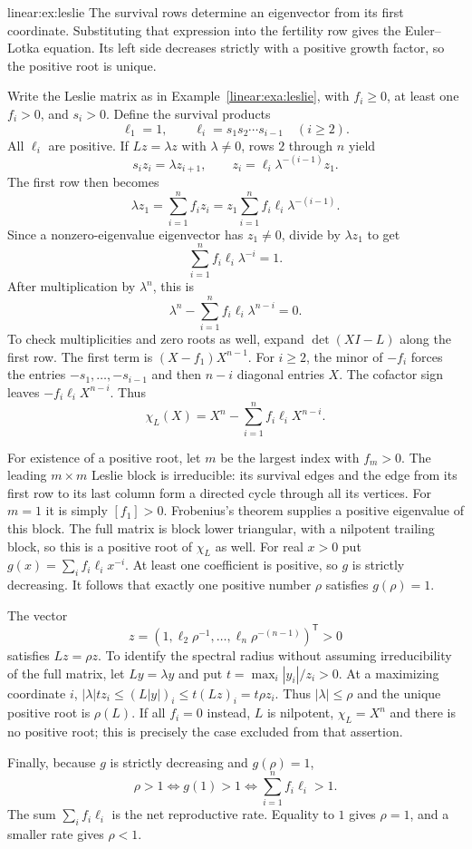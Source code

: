 \begin{solution}{linear:ex:leslie}
\idea The survival rows determine an eigenvector from its first coordinate. Substituting that expression into the fertility row gives the Euler--Lotka equation. Its left side decreases strictly with a positive growth factor, so the positive root is unique.

\writeup Write the Leslie matrix as in Example~\ref{linear:exa:leslie}, with $f_i\ge0$, at least one $f_i>0$, and $s_i>0$. Define the survival products
\[
\ell_1=1,\qquad \ell_i=s_1s_2\cdots s_{i-1}\quad(i\ge2).
\]
All $\ell_i$ are positive. If $Lz=\lambda z$ with $\lambda\ne0$, rows $2$ through $n$ yield
\[
s_i z_i=\lambda z_{i+1},
\qquad
z_i=\ell_i\lambda^{-(i-1)}z_1.
\]
The first row then becomes
\[
\lambda z_1
=\sum_{i=1}^n f_i z_i
=z_1\sum_{i=1}^n f_i\ell_i\lambda^{-(i-1)}.
\]
Since a nonzero-eigenvalue eigenvector has $z_1\ne0$, divide by $\lambda z_1$ to get
\[
\boxed{\sum_{i=1}^n f_i\ell_i\lambda^{-i}=1}.
\]
After multiplication by $\lambda^n$, this is
\[
\lambda^n-\sum_{i=1}^n f_i\ell_i\lambda^{n-i}=0.
\]
To check multiplicities and zero roots as well, expand $\det(XI-L)$ along
the first row. The first term is $(X-f_1)X^{n-1}$. For $i\ge2$, the minor
of $-f_i$ forces the entries $-s_1,\ldots,-s_{i-1}$ and then $n-i$
diagonal entries $X$. The cofactor sign leaves $-f_i\ell_iX^{n-i}$.
Thus
\[
\boxed{\chi_L(X)=X^n-\sum_{i=1}^n f_i\ell_i X^{n-i}}.
\]

For existence of a positive root, let $m$ be the largest index with $f_m>0$.
The leading $m\times m$ Leslie block is irreducible: its survival edges
and the edge from its first row to its last column form a directed cycle
through all its vertices. For $m=1$ it is simply $[f_1]>0$.
Frobenius's theorem supplies a positive eigenvalue of this block.
The full matrix is block lower triangular, with a nilpotent trailing block,
so this is a positive root of $\chi_L$ as well.
For real $x>0$ put $g(x)=\sum_i f_i\ell_i x^{-i}$.
At least one coefficient is positive, so $g$ is strictly decreasing.
It follows that exactly one positive number $\rho$ satisfies $g(\rho)=1$.

The vector
\[
z=(1,\ell_2\rho^{-1},\ldots,\ell_n\rho^{-(n-1)})^{\mathsf T}>0
\]
satisfies $Lz=\rho z$. To identify the spectral radius without assuming
irreducibility of the full matrix, let $Ly=\lambda y$ and put
$t=\max_i|y_i|/z_i>0$. At a maximizing coordinate $i$,
$|\lambda|t z_i\le(L|y|)_i\le t(Lz)_i=t\rho z_i$.
Thus $|\lambda|\le\rho$ and the unique positive root is $\rho(L)$.
If all $f_i=0$ instead, $L$ is nilpotent, $\chi_L=X^n$ and there is no
positive root; this is precisely the case excluded from that assertion.

Finally, because $g$ is strictly decreasing and $g(\rho)=1$,
\[
\rho>1\iff g(1)>1
\iff\boxed{\sum_{i=1}^n f_i\ell_i>1}.
\]
The sum $\sum_i f_i\ell_i$ is the net reproductive rate. Equality to $1$ gives $\rho=1$, and a smaller rate gives $\rho<1$.
\end{solution}

